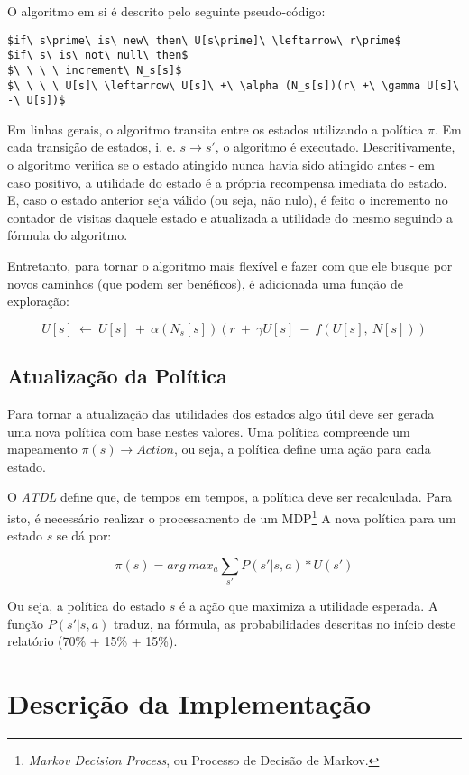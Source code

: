\documentclass[letterpaper]{article}
\begin{document}
O algoritmo em si é descrito pelo seguinte pseudo-código:

\begin{lstlisting}
$if\ s\prime\ is\ new\ then\ U[s\prime]\ \leftarrow\ r\prime$
$if\ s\ is\ not\ null\ then$
$\ \ \ \ increment\ N_s[s]$
$\ \ \ \ U[s]\ \leftarrow\ U[s]\ +\ \alpha (N_s[s])(r\ +\ \gamma U[s]\ -\ U[s])$
\end{lstlisting}

Em linhas gerais, o algoritmo transita entre os estados utilizando a política $\pi$. Em cada
transição de estados, i. e. $s \rightarrow s\prime$, o algoritmo é executado. Descritivamente,
o algoritmo verifica se o estado atingido nunca havia sido atingido antes - em caso positivo,
a utilidade do estado é a própria recompensa imediata do estado. E, caso o estado anterior seja
válido (ou seja, não nulo), é feito o incremento no contador de visitas daquele estado e
atualizada a utilidade do mesmo seguindo a fórmula do algoritmo.

Entretanto, para tornar o algoritmo mais flexível e fazer com que ele busque por novos caminhos
(que podem ser benéficos), é adicionada uma função de exploração:

\[U[s]\ \leftarrow\ U[s]\ +\ \alpha (N_s[s])(r\ +\ \gamma U[s]\ -\ f(U[s],\ N[s]))\]

\subsection{Atualização da Política}

Para tornar a atualização das utilidades dos estados algo útil deve ser gerada uma nova política
com base nestes valores. Uma política compreende um mapeamento $\pi(s) \rightarrow Action$, ou
seja, a política define uma ação para cada estado.

O \textit{ATDL} define que, de tempos em tempos, a política deve ser recalculada. Para isto, é
necessário realizar o processamento de um MDP\footnote{\textit{Markov Decision Process}, ou
Processo de Decisão de Markov.} A nova política para um estado $s$ se dá por:

\[\pi(s) = arg\ max_a \sum\limits_{s\prime} P(s\prime|s,a) * U(s\prime)\]

Ou seja, a política do estado $s$ é a ação que maximiza a utilidade esperada. A função $P(s\prime|s,a)$
traduz, na fórmula, as probabilidades descritas no início deste relatório (70\% + 15\% + 15\%).

\section{Descrição da Implementação}
\end{document}
